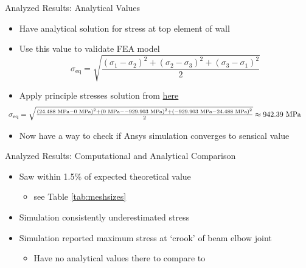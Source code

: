 \documentclass[11pt]{beamer}
\begin{document}
    \begin{frame}{Analyzed Results: Analytical Values}
        \begin{itemize} 
            \item Have analytical solution for stress at top element of wall
            \item Use this value to validate FEA model
            \begin{equation}
                \sigma_{\textrm{eq}} = \sqrt{\frac{{\left(\sigma_1 - \sigma_2\right)}^2 + {\left(\sigma_2 - \sigma_3\right)}^2 + {\left(\sigma_3 - \sigma_1\right)}^2}{2}}
            \end{equation}
            \item Apply principle stresses solution from \href{https://github.com/A-Person7/a_design_class/blob/main/hw3/problem1.m}{here}
            \begin{equation}\label{analytic_sln}
                \hspace{-24pt}
                \resizebox{1\textwidth}{!}{$%
                    \sigma_{\textrm{eq}} = \sqrt{\frac{{\left(24.488\textrm{ MPa} - 0\textrm{ MPa}\right)}^2 + {\left(0\textrm{ MPa} - -929.903\textrm{ MPa}\right)}^2 + {\left(-929.903\textrm{ MPa} - 24.488\textrm{ MPa}\right)}^2}{2}} \approx 942.39\textrm{ MPa}
                $%
                }%
            \end{equation}
            \item Now have a way to check if Ansys simulation converges to sensical value
        \end{itemize}
    \end{frame}

    \begin{frame}{Analyzed Results: Computational and Analytical Comparison}
        \begin{itemize} 
            \item Saw within 1.5\% of expected theoretical value 
            \begin{itemize}
                \item see Table \ref{tab:meshsizes}
            \end{itemize}
            \item Simulation consistently underestimated stress
            \item Simulation reported maximum stress at `crook' of beam elbow joint
            \begin{itemize} 
                \item Have no analytical values there to compare to
            \end{itemize}
        \end{itemize}
    \end{frame}
\end{document}
